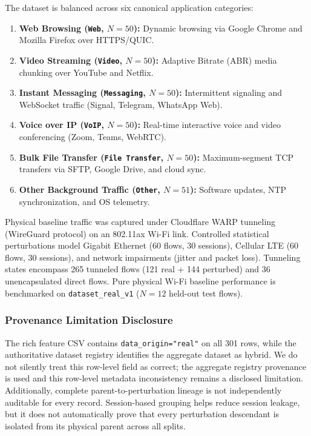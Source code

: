 \documentclass[conference]{IEEEtran}
\begin{document}
The dataset is balanced across six canonical application categories:
\begin{enumerate}
    \item \textbf{Web Browsing (\texttt{Web}, $N=50$):} Dynamic browsing via Google Chrome and Mozilla Firefox over HTTPS/QUIC.
    \item \textbf{Video Streaming (\texttt{Video}, $N=50$):} Adaptive Bitrate (ABR) media chunking over YouTube and Netflix.
    \item \textbf{Instant Messaging (\texttt{Messaging}, $N=50$):} Intermittent signaling and WebSocket traffic (Signal, Telegram, WhatsApp Web).
    \item \textbf{Voice over IP (\texttt{VoIP}, $N=50$):} Real-time interactive voice and video conferencing (Zoom, Teams, WebRTC).
    \item \textbf{Bulk File Transfer (\texttt{File Transfer}, $N=50$):} Maximum-segment TCP transfers via SFTP, Google Drive, and cloud sync.
    \item \textbf{Other Background Traffic (\texttt{Other}, $N=51$):} Software updates, NTP synchronization, and OS telemetry.
\end{enumerate}

Physical baseline traffic was captured under Cloudflare WARP tunneling (WireGuard protocol) on an 802.11ax Wi-Fi link. Controlled statistical perturbations model Gigabit Ethernet (60 flows, 30 sessions), Cellular LTE (60 flows, 30 sessions), and network impairments (jitter and packet loss). Tunneling states encompass 265 tunneled flows (121 real + 144 perturbed) and 36 unencapsulated direct flows. Pure physical Wi-Fi baseline performance is benchmarked on \texttt{dataset\_real\_v1} ($N=12$ held-out test flows).

\subsubsection{Provenance Limitation Disclosure}
The rich feature CSV contains \texttt{data\_origin="real"} on all 301 rows, while the authoritative dataset registry identifies the aggregate dataset as hybrid. We do not silently treat this row-level field as correct; the aggregate registry provenance is used and this row-level metadata inconsistency remains a disclosed limitation. Additionally, complete parent-to-perturbation lineage is not independently auditable for every record. Session-based grouping helps reduce session leakage, but it does not automatically prove that every perturbation descendant is isolated from its physical parent across all splits.
\end{document}
